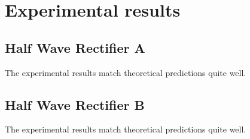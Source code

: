 \documentclass[12pt]{article}
\begin{document}
\section{Experimental results}
\subsection{Half Wave Rectifier A}
\begin{figure}[H]
  \begin{center}
\end{center}
\end{figure}
The experimental results match theoretical predictions quite well.

\subsection{Half Wave Rectifier B}
\begin{figure}[H]
  \begin{center}
\end{center}
\end{figure}
The experimental results match theoretical predictions quite well. 
\end{document}
